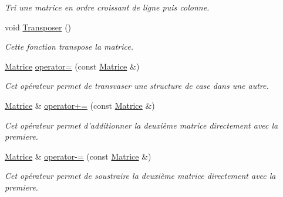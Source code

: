 \begin{DoxyCompactItemize}
\begin{DoxyCompactList}\small\item\em Tri une matrice en ordre croissant de ligne puis colonne. \end{DoxyCompactList}\item 
\hypertarget{classMatrice_a604be0a5e3925564ca941b5aac3f9159}{void \hyperlink{classMatrice_a604be0a5e3925564ca941b5aac3f9159}{Transposer} ()}\label{classMatrice_a604be0a5e3925564ca941b5aac3f9159}

\begin{DoxyCompactList}\small\item\em Cette fonction transpose la matrice. \end{DoxyCompactList}\item 
\hypertarget{classMatrice_a11fcd2b8cc508ab5706c66aa786d4cd6}{\hyperlink{classMatrice}{Matrice} \hyperlink{classMatrice_a11fcd2b8cc508ab5706c66aa786d4cd6}{operator=} (const \hyperlink{classMatrice}{Matrice} \&)}\label{classMatrice_a11fcd2b8cc508ab5706c66aa786d4cd6}

\begin{DoxyCompactList}\small\item\em Cet opérateur permet de transvaser une structure de case dans une autre. \end{DoxyCompactList}\item 
\hypertarget{classMatrice_a050273c3abc4f41564722d0ff566290d}{\hyperlink{classMatrice}{Matrice} \& \hyperlink{classMatrice_a050273c3abc4f41564722d0ff566290d}{operator+=} (const \hyperlink{classMatrice}{Matrice} \&)}\label{classMatrice_a050273c3abc4f41564722d0ff566290d}

\begin{DoxyCompactList}\small\item\em Cet opérateur permet d'additionner la deuxième matrice directement avec la premiere. \end{DoxyCompactList}\item 
\hypertarget{classMatrice_a67b2f0d47db23141cbd33cce7e8291d2}{\hyperlink{classMatrice}{Matrice} \& \hyperlink{classMatrice_a67b2f0d47db23141cbd33cce7e8291d2}{operator-\/=} (const \hyperlink{classMatrice}{Matrice} \&)}\label{classMatrice_a67b2f0d47db23141cbd33cce7e8291d2}

\begin{DoxyCompactList}\small\item\em Cet opérateur permet de soustraire la deuxième matrice directement avec la premiere. \end{DoxyCompactList}\end{DoxyCompactItemize}


